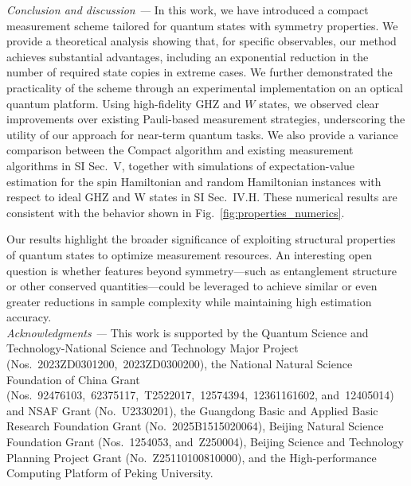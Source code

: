 \documentclass[prl,aps,twocolumn,notitlepage,superscriptaddress,showpacs,nofootinbib]{revtex4-2}
\newcommand{\red}[1]{{\color{red} #1}}
\begin{document}
\textit{Conclusion and discussion --- }
In this work, we have introduced a compact measurement scheme tailored for quantum states with symmetry properties. We provide a theoretical analysis showing that, for specific observables, our method achieves substantial advantages, including an exponential reduction in the number of required state copies in extreme cases. We further demonstrated the practicality of the scheme through an experimental implementation on an optical quantum platform. Using high-fidelity GHZ and $W$ states, we observed clear improvements over existing Pauli-based measurement strategies, underscoring the utility of our approach for near-term quantum tasks. \red{We also provide a variance comparison between the Compact algorithm and existing measurement algorithms in SI Sec.~V, together with simulations of expectation-value estimation for the spin Hamiltonian and random Hamiltonian instances with respect to ideal GHZ and W states in SI Sec.~IV.H. 
These numerical results are consistent with the behavior shown in Fig.~\ref{fig:properties_numerics}.}

Our results highlight the broader significance of exploiting structural properties of quantum states to optimize measurement resources. An interesting open question is whether features beyond symmetry—such as entanglement structure or other conserved quantities—could be leveraged to achieve similar or even greater reductions in sample complexity while maintaining high estimation accuracy.\\

\emph{Acknowledgments ---} 
This work is supported by the Quantum Science and Technology-National Science and Technology Major Project (Nos.~2023ZD0301200,~2023ZD0300200),
the National Natural Science Foundation of China Grant (Nos.~92476103,~62375117,~T2522017,~12574394,~12361161602, and~12405014) and NSAF Grant (No.~U2330201), the Guangdong Basic and Applied Basic Research Foundation Grant (No.~2025B1515020064), Beijing Natural Science Foundation Grant (Nos.~1254053, and~Z250004), Beijing Science and Technology Planning Project Grant (No.~Z25110100810000), and the High-performance Computing Platform of Peking University.


\end{document}
